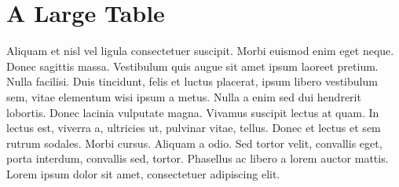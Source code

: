 \chapter{A Large Table}
\label{chapter:appendixB}

Aliquam et nisl vel ligula consectetuer suscipit. Morbi euismod enim eget neque. Donec sagittis massa. Vestibulum quis augue sit amet ipsum laoreet pretium. Nulla facilisi. Duis tincidunt, felis et luctus placerat, ipsum libero vestibulum sem, vitae elementum wisi ipsum a metus. Nulla a enim sed dui hendrerit lobortis. Donec lacinia vulputate magna. Vivamus suscipit lectus at quam. In lectus est, viverra a, ultricies ut, pulvinar vitae, tellus. Donec et lectus et sem rutrum sodales. Morbi cursus. Aliquam a odio. Sed tortor velit, convallis eget, porta interdum, convallis sed, tortor. Phasellus ac libero a lorem auctor mattis. Lorem ipsum dolor sit amet, consectetuer adipiscing elit.